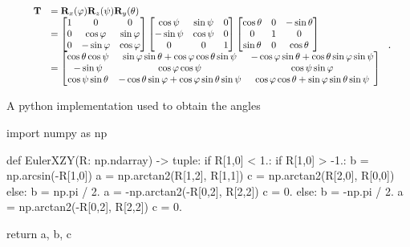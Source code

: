         \begin{equation}
            \scalebox{0.85}{
                $ \begin{array}{ll}
                    \mathbf{T}
                    &= \mathbf{R}_{x}(\varphi)\mathbf{R}_{z}(\psi)\mathbf{R}_{y}(\theta) \\
                    &=
                    \begin{bmatrix}
                        1 & 0 & 0 \\
                        0 & \cos \varphi & \sin \varphi \\
                        0 & -\sin \varphi & \cos \varphi
                    \end{bmatrix}
                    \begin{bmatrix}
                        \cos \psi & \sin \psi & 0 \\
                        -\sin \psi & \cos \psi & 0 \\
                        0 & 0 & 1
                    \end{bmatrix}
                    \begin{bmatrix}
                        \cos \theta & 0 & -\sin \theta \\
                        0 & 1 & 0 \\
                        \sin \theta & 0 & \cos \theta
                    \end{bmatrix} \\
                    &=
                    \begin{bmatrix}
                        \cos \theta \cos \psi
                        &  \sin \varphi \sin \theta + \cos \varphi \cos \theta \sin \psi
                        & -\cos \varphi \sin \theta + \cos \theta \sin \varphi \sin \psi \\
                        -\sin \psi
                        & \cos \varphi \cos \psi
                        & \cos \psi \sin \varphi \\
                        \cos \psi \sin \theta
                        & -\cos \theta \sin \varphi + \cos \varphi \sin \theta \sin \psi
                        & \cos \varphi \cos \theta + \sin \varphi \sin \theta \sin \psi
                    \end{bmatrix}
                \end{array} $
            }
        .\end{equation}

        A python implementation used to obtain the angles
\begin{python}
import numpy as np

def EulerXZY(R: np.ndarray) -> tuple:
    if R[1,0] < 1.:
        if R[1,0] > -1.:
            b = np.arcsin(-R[1,0])
            a = np.arctan2(R[1,2], R[1,1])
            c = np.arctan2(R[2,0], R[0,0])
        else:
            b = np.pi / 2.
            a = -np.arctan2(-R[0,2], R[2,2])
            c = 0.
    else:
        b = -np.pi / 2.
        a = np.arctan2(-R[0,2], R[2,2])
        c = 0.

    return a, b, c
\end{python}


